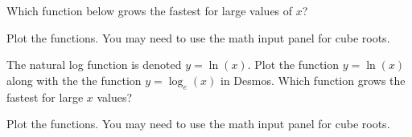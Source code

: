 \documentclass{ximera}
\begin{document}
\begin{question}
Which function below grows the fastest for large values of $x$?
  \begin{solution}
    \begin{hint}
      Plot the functions. You may need to use the math input panel for cube roots.
    \end{hint}
    \begin{multiple-choice}
    \end{multiple-choice}
  \end{solution}
\end{question}

\begin{question}
The natural log function is denoted $y=\ln(x)$. Plot the function $y=\ln(x)$ along with the the function $y=\log_e(x)$ in Desmos. Which function grows the fastest for large $x$ values?
  \begin{solution}
    \begin{hint}
      Plot the functions. You may need to use the math input panel for cube roots.
    \end{hint}
    \begin{multiple-choice}
    \end{multiple-choice}
  \end{solution}
\end{question}
\end{document}
